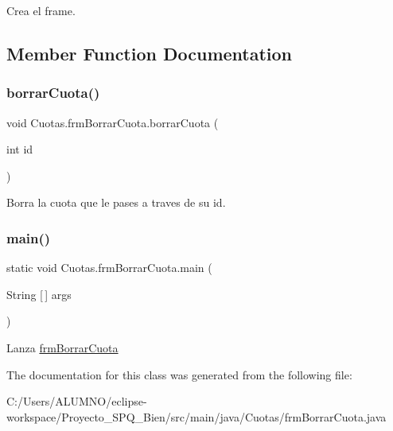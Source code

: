 Crea el frame. 

\subsection{Member Function Documentation}
\mbox{\label{class_cuotas_1_1frm_borrar_cuota_a93f34d4f2c825db8d6050660c2b2679a}} 
\subsubsection{\texorpdfstring{borrar\+Cuota()}{borrarCuota()}}
{\footnotesize\ttfamily void Cuotas.\+frm\+Borrar\+Cuota.\+borrar\+Cuota (\begin{DoxyParamCaption}\item[{int}]{id }\end{DoxyParamCaption})}

Borra la cuota que le pases a traves de su id. \mbox{\label{class_cuotas_1_1frm_borrar_cuota_afbe843b84f2ad8b3fda58d1fe8ae3889}} 
\subsubsection{\texorpdfstring{main()}{main()}}
{\footnotesize\ttfamily static void Cuotas.\+frm\+Borrar\+Cuota.\+main (\begin{DoxyParamCaption}\item[{String \mbox{[}$\,$\mbox{]}}]{args }\end{DoxyParamCaption})\hspace{0.3cm}{\ttfamily [static]}}

Lanza \hyperlink{class_cuotas_1_1frm_borrar_cuota}{frm\+Borrar\+Cuota} 

The documentation for this class was generated from the following file\+:\begin{DoxyCompactItemize}
\item 
C\+:/\+Users/\+A\+L\+U\+M\+N\+O/eclipse-\/workspace/\+Proyecto\+\_\+\+S\+P\+Q\+\_\+Bien/src/main/java/\+Cuotas/frm\+Borrar\+Cuota.\+java\end{DoxyCompactItemize}
